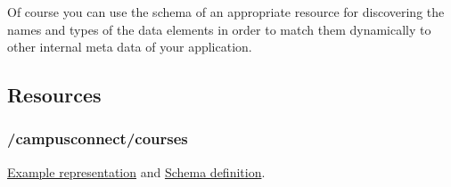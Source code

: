 Of course you can use the schema of an appropriate resource for discovering the
names and types of the data elements in order to match them dynamically to
other internal meta data of your application.


\hypertarget{campusconnect_resources}{}
\subsection{Resources}

\subsubsection{/campusconnect/courses}
\href{https://ecs.uni-stuttgart.de/ecsa-wiki/CampusConnect/Arbeitspakete/EcsREST/CmsCourses}{Example representation} and
\href{http://repo.or.cz/w/ecs.git/blob_plain/HEAD:/campusconnect/schemas/cc_courses.schema.json}{Schema definition}.



